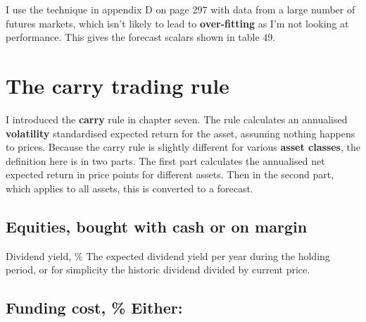 I use the technique in appendix D on page 297 with data from a large number of futures markets, which isn't likely to lead to \textbf{over-fitting} as I'm not looking at performance. This gives the forecast scalars shown in table 49.

 

\section*{The carry trading rule}  {}

I introduced the \textbf{carry} rule in chapter seven. The rule calculates an annualised \textbf{volatility} standardised expected return for the asset, assuming nothing happens to prices. Because the carry rule is slightly different for various \textbf{asset classes}, the definition here is in two parts. The first part calculates the annualised net expected return in price points for different assets. Then in the second part, which applies to all assets, this is converted to a forecast.

\subsection*{Equities, bought with cash or on margin}

Dividend yield, \% The expected dividend yield per year during the holding period, or for simplicity the historic dividend divided by current price.

\subsection*{Funding cost, \% Either:}

